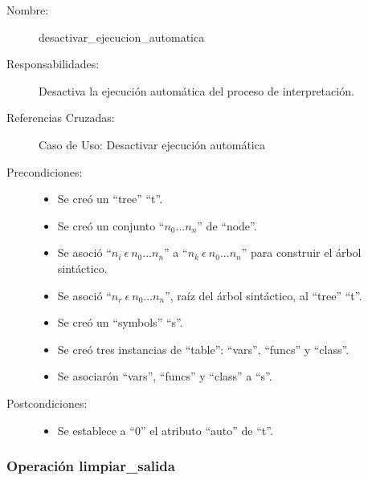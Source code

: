 	\begin{description}
		\item [Nombre:] desactivar\_ejecucion\_automatica
		\item [Responsabilidades:] Desactiva la ejecución automática del proceso de interpretación.
		\item [Referencias Cruzadas: ] Caso de Uso: Desactivar ejecución automática
      \item [Precondiciones:] \hfill
         \begin {itemize}
         \item Se creó un ``tree'' ``t''.
         \item Se creó un conjunto ``$n_0...n_n$'' de ``node''.
         \item Se asoció ``$n_i\ \epsilon\ n_0...n_n$'' a ``$n_k\ \epsilon\ n_0...n_n$'' para construir el árbol sintáctico.
         \item Se asoció  ``$n_r\ \epsilon\ n_0...n_n$'', raíz del árbol sintáctico, al ``tree'' ``t''.
         \item Se creó un ``symbols'' ``s''.
         \item Se creó tres instancias de ``table'': ``vars'', ``funcs'' y ``class''.
         \item Se asociarón ``vars'', ``funcs'' y ``class'' a ``s''.
      \end{itemize}
      \item [Postcondiciones:] \hfill
      \begin {itemize}
         \item Se establece a ``0'' el atributo ``auto'' de ``t''.
      \end{itemize}
	\end{description} 


\subsubsection{Operación limpiar\_salida}

